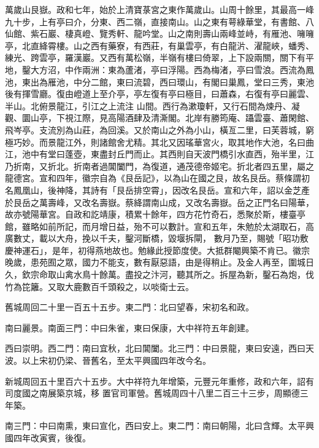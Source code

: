\begin{pinyinscope}
 萬歲山艮嶽。政和七年，始於上清寶菉宮之東作萬歲山。山周十餘里，其最高一峰九十步，上有亭曰介，分東、西二嶺，直接南山。山之東有萼綠華堂，有書館、八仙館、紫石巖、棲真嶝、覽秀軒、龍吟堂。山之南則壽山兩峰並峙，有雁池、噰噰亭，北直絳霄樓。山之西有藥寮，有西莊，有巢雲亭，有白龍沜、濯龍峽，蟠秀、練光、跨雲亭，羅漢巖。又西有萬松嶺，半嶺有樓曰倚翠，上下設兩關，關下有平地，鑿大方沼，中作兩洲：東為蘆渚，亭曰浮陽。西為梅渚，亭曰雪浪。西流為鳳池，東出為雁池，中分二館，東曰流碧，西曰環山，有閣曰巢鳳，堂曰三秀，東池後有揮雪廳。復由嶝道上至介亭，亭左復有亭曰極目，曰蕭森，右復有亭曰麗雲、半山。北俯景龍江，引江之上流注
 山間。西行為漱瓊軒，又行石間為煉丹、凝觀、圜山亭，下視江際，見高陽酒肆及清澌閣。北岸有勝筠庵、躡雲臺、蕭閑館、飛岑亭。支流別為山莊，為回溪。又於南山之外為小山，橫亙二里，曰芙蓉城，窮極巧妙。而景龍江外，則諸館舍尤精。其北又因瑤華宮火，取其地作大池，名曰曲江，池中有堂曰蓬壺，東盡封丘門而止。其西則自天波門橋引水直西，殆半里，江乃折南，又折北。折南者過閶闔門，為復道，通茂德帝姬宅。折北者四五里，屬之龍德宮。宣和四年，徽宗自為《艮岳記》，以為山在國之艮，故名艮岳。蔡條謂初名鳳凰山，後神降，其詩有「艮岳排空霄」，因改名艮岳。宣和六年，詔以金芝產於艮岳之萬壽峰，又改名壽嶽。蔡絳謂南山成，又改名壽嶽。岳之正門名曰陽華，故亦號陽華宮。自政和訖靖康，積累十餘年，四方花竹奇石，悉聚於斯，樓臺亭館，雖略如前所記，而月增日益，殆不可以數計。宣和五年，朱勉於太湖取石，高廣數丈，載以大舟，挽以千夫，鑿河斷橋，毀堰拆閘，
 數月乃至，賜號「昭功敷慶神運石」，是年，初得燕地故也。勉緣此授節度使。大抵群閹興築不肯已。徽宗晚歲，患苑囿之眾，國力不能支，數有厭惡語，由是得稍止。及金人再至，圍城日久，欽宗命取山禽水鳥十餘萬。盡投之汴河，聽其所之。拆屋為新，鑿石為炮，伐竹為笓籬。又取大鹿數百千頭殺之，以啖衛士云。



 舊城周回二十里一百五十五步。東二門：北曰望春，宋初名和政。



 南曰麗景。南面三門：中曰朱雀，東曰保康，大中祥符五年創建。



 西曰崇明。西二門：南曰宜秋，北曰閶闔。北三門：中曰景龍，東曰安遠，西曰天波。以上宋初仍梁、晉舊名，至太平興國四年改今名。



 新城周回五十里百六十五步。大中祥符九年增築，元豐元年重修，政和六年，詔有司度國之南展築京城，移
 置官司軍營。舊城周四十八里二百三十三步，周顯德三年築。



 南三門：中曰南熏，東曰宣化，西曰安上。東二門：南曰朝陽，北曰含輝。太平興國四年改寅賓，後復。




\end{pinyinscope}
